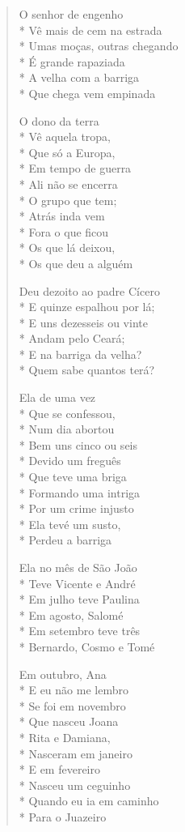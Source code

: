 \begin{verse}
O senhor de engenho\\*
Vê mais de cem na estrada\\*
Umas moças, outras chegando\\*
É grande rapaziada\\*
A velha com a barriga\\*
Que chega vem empinada

O dono da terra\\*
Vê aquela tropa,\\*
Que só a Europa,\\*
Em tempo de guerra\\*
Ali não se encerra\\*
O grupo que tem;\\*
Atrás inda vem\\*
Fora o que ficou\\*
Os que lá deixou,\\*
Os que deu a alguém

Deu dezoito ao padre Cícero\\*
E quinze espalhou por lá;\\*
E uns dezesseis ou vinte\\*
Andam pelo Ceará;\\*
E na barriga da velha?\\*
Quem sabe quantos terá?

Ela de uma vez\\*
Que se confessou,\\*
Num dia abortou\\*
Bem uns cinco ou seis\\*
Devido um freguês\\*
Que teve uma briga\\*
Formando uma intriga\\*
Por um crime injusto\\*
Ela tevé um susto,\\*
Perdeu a barriga

Ela no mês de São João\\*
Teve Vicente e André\\*
Em julho teve Paulina\\*
Em agosto, Salomé\\*
Em setembro teve três\\*
Bernardo, Cosmo e Tomé

Em outubro, Ana\\*
E eu não me lembro\\*
Se foi em novembro\\*
Que nasceu Joana\\*
Rita e Damiana,\\*
Nasceram em janeiro\\*
E em fevereiro\\*
Nasceu um ceguinho\\*
Quando eu ia em caminho\\*
Para o Juazeiro


\end{verse}
